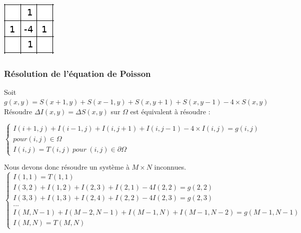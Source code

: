 \begin{center}
    \includegraphics[scale = 0.8]{Images/Laplacian.png}
\end{center}

\subsubsection{Résolution de l'équation de Poisson} 
Soit $g(x,y) = S(x+1,y) + S(x-1,y)+ S(x,y+1) + S(x,y-1) - 			4\times S(x,y)$\\
Résoudre $\Delta I(x,y) = \Delta S(x,y)$ sur $\Omega$ est équivalent à résoudre :\\
\begin{center}
\begin{equation*}
    \left \{
    \begin{aligned}
    I(i+1,j) + I(i-1,j)+ I(i,j+1) + I(i, j-1) - 4\times 			I(i,j)= g(i,j)\\ pour (i,j)\in \Omega \\
    I(i,j) = T(i,j) \ pour \ (i,j) \in \partial \Omega
    \end{aligned}
    \right.
\end{equation*}
\end{center}
Nous devons donc résoudre un système à $M\times N $ inconnues.
\begin{equation}
\left\{
\begin{aligned}
I(1,1) = T(1,1)\\
I(3,2)+I(1,2)+ I(2,3)+I(2,1)-4I(2,2) =g(2,2) \\
I(3,3)+I(1,3)+ I(2,4)+I(2,2)-4I(2,3) =g(2,3)             \\
... \\
I(M,N-1)+I(M-2,N-1)+ I(M-1,N)+I(M-1,N-2) =g(M-1,N-1)\\
I(M, N) = T(M, N)
\end{aligned}
\right.
\end{equation}

